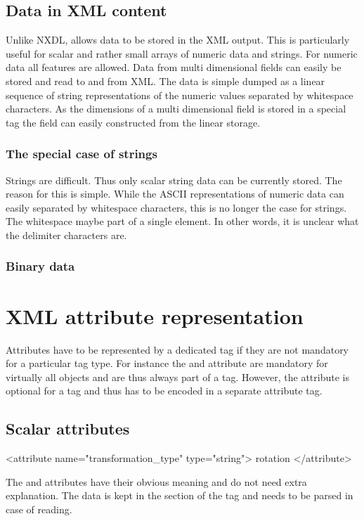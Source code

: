 \subsection{Data in XML content} 

Unlike NXDL, \libpniio allows data to be stored in the XML output. This is 
particularly useful for scalar and rather small arrays of numeric data 
and strings. For numeric data all features are allowed. Data from multi
dimensional fields can easily be stored and read to and from XML. 
The data is simple dumped as a linear sequence of string representations of the 
numeric values separated by whitespace characters. 
As the dimensions of a multi dimensional field is stored in a special tag 
the field can easily constructed from the linear storage.

\subsubsection{The special case of strings} 

Strings are difficult. Thus only scalar string data can be currently stored. 
The reason for this is simple. While the ASCII representations of numeric data
can easily separated by whitespace characters, this is no longer the case for
strings. The whitespace maybe part of a single element. In other words, it is 
unclear what the delimiter characters are. 

\subsubsection{Binary data}

\section{XML attribute representation}

Attributes have to be represented by a dedicated tag if they are not mandatory
for a particular tag type. For instance the  and  attribute
are mandatory for virtually all objects and are thus always part of a tag. 
However, the  attribute is optional for a 
tag and thus has to be encoded in a separate attribute tag. 

\subsection{Scalar attributes}
\begin{xmlcode}
<attribute name="transformation_type" type="string"> rotation </attribute>
\end{xmlcode}
The  and  attributes have their obvious meaning and do not
need extra explanation. 
The data is kept in the  section of the tag and needs to be parsed 
in case of reading.

